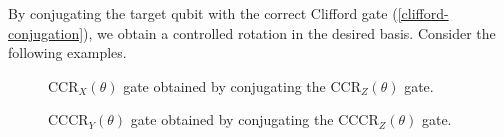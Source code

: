 By conjugating the target qubit with the correct Clifford gate (\ref{clifford-conjugation}), we obtain a controlled rotation in the desired basis. Consider the following examples.

\begin{figure}[H]
    \centering
    \caption{CCR$_X(\theta)$ gate obtained by conjugating the CCR$_Z(\theta)$ gate.}
\end{figure}

\begin{figure}[H]
    \centering
    \caption{CCCR$_Y(\theta)$ gate obtained by conjugating the CCCR$_Z(\theta)$ gate.}
    \label{cccry}
\end{figure}
